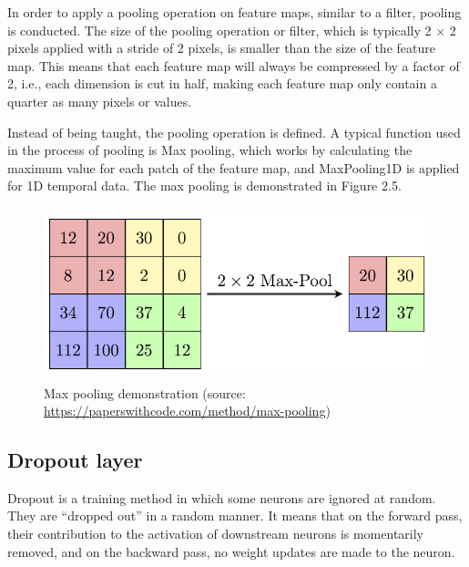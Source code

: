 In order to apply a pooling operation on feature maps, similar to a filter, pooling is conducted. The size of the pooling operation or filter, which is typically 2 $\times$ 2 pixels applied with a stride of 2 pixels, is smaller than the size of the feature map. This means that each feature map will always be compressed by a factor of 2, i.e., each dimension is cut in half, making each feature map only contain a quarter as many pixels or values.

Instead of being taught, the pooling operation is defined. A typical function used in the process of pooling is Max pooling, which works by calculating the maximum value for each patch of the feature map, and MaxPooling1D is applied for 1D temporal data. The max pooling is demonstrated in Figure 2.5.

\begin{figure}[!h]
	\centering
	\includegraphics[width=\linewidth, height=5cm,keepaspectratio]{figures/maxpooling.png}
   \caption{Max pooling demonstration (source: \url{https://paperswithcode.com/method/max-pooling})}
\end{figure}
\newpage
\subsection{Dropout layer}
\hspace{0.5cm}Dropout is a training method in which some neurons are ignored at random. They are ``dropped out'' in a random manner. It means that on the forward pass, their contribution to the activation of downstream neurons is momentarily removed, and on the backward pass, no weight updates are made to the neuron.

